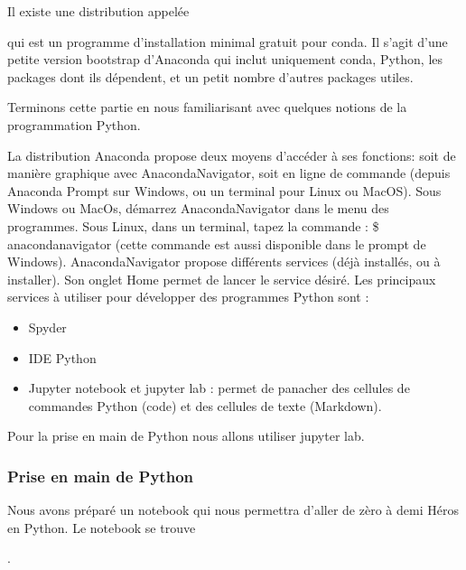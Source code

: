 \documentclass[letterpaper,11pt,english]{sphinxmanual}
\begin{document}
\sphinxAtStartPar
Il existe une distribution appelée
%
\begin{footnote}[4]\sphinxAtStartFootnote
{}
%
\end{footnote} qui est
un programme d’installation minimal gratuit pour conda. Il s’agit d’une
petite version bootstrap d’Anaconda qui inclut uniquement conda, Python,
les packages dont ils dépendent, et un petit nombre d’autres packages
utiles.

\sphinxAtStartPar
Terminons cette partie en nous familiarisant avec quelques notions de la
programmation Python.

\sphinxAtStartPar
{}

\sphinxAtStartPar
La distribution Anaconda propose deux moyens d’accéder à ses fonctions:
soit de manière graphique avec Anaconda\sphinxhyphen{}Navigator, soit en ligne de
commande (depuis Anaconda Prompt sur Windows, ou un terminal pour Linux
ou MacOS). Sous Windows ou MacOs, démarrez Anaconda\sphinxhyphen{}Navigator dans le
menu des programmes. Sous Linux, dans un terminal, tapez la commande : \$
anaconda\sphinxhyphen{}navigator (cette commande est aussi disponible dans le prompt
de Windows). Anaconda\sphinxhyphen{}Navigator propose différents services (déjà
installés, ou à installer). Son onglet Home permet de lancer le service
désiré. Les principaux services à utiliser pour développer des
programmes Python sont :
\begin{itemize}
\item {} 
\sphinxAtStartPar
Spyder

\item {} 
\sphinxAtStartPar
IDE Python

\item {} 
\sphinxAtStartPar
Jupyter notebook et jupyter lab : permet de panacher des cellules de
commandes Python (code) et des cellules de texte (Markdown).

\end{itemize}

\sphinxAtStartPar
Pour la prise en main de Python nous allons utiliser jupyter lab.


\subsubsection{Prise en main de Python}
\label{\detokenize{chapter2:prise-en-main-de-python}}
\sphinxAtStartPar
Nous avons préparé un notebook qui nous permettra d’aller de zèro à demi
Héros en Python. Le notebook se trouve
%
\begin{footnote}[5]\sphinxAtStartFootnote
{}
%
\end{footnote}.
\end{document}
